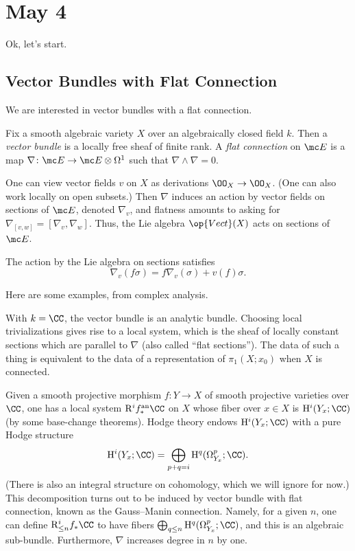 \documentclass[../notes.tex]{subfiles}
\begin{document}
\section{May 4}
Ok, let's start.

\subsection{Vector Bundles with Flat Connection}
We are interested in vector bundles with a flat connection.
\begin{definition}
	Fix a smooth algebraic variety $X$ over an algebraically closed field $k$. Then a \textit{vector bundle} is a locally free sheaf of finite rank. A \textit{flat connection} on $\mc E$ is a map $\nabla\colon\mc E\to\mc E\otimes\Omega^1$ such that $\nabla\land\nabla=0$.
\end{definition}
\begin{remark}
	One can view vector fields $v$ on $X$ as derivations $\OO_X\to\OO_X$. (One can also work locally on open subsets.) Then $\nabla$ induces an action by vector fields on sections of $\mc E$, denoted $\nabla_v$, and flatness amounts to asking for $\nabla_{[v,w]}=[\nabla_v,\nabla_w]$. Thus, the Lie algebra $\op{Vect}(X)$ acts on sections of $\mc E$.
\end{remark}
\begin{remark}
	The action by the Lie algebra on sections satisfies
	\[\nabla_v(f\sigma)=f\nabla_v(\sigma)+v(f)\sigma.\]
\end{remark}
Here are some examples, from complex analysis.
\begin{example}
	With $k=\CC$, the vector bundle is an analytic bundle. Choosing local trivializations gives rise to a local system, which is the sheaf of locally constant sections which are parallel to $\nabla$ (also called ``flat sections''). The data of such a thing is equivalent to the data of a representation of $\pi_1(X;x_0)$ when $X$ is connected.
\end{example}
\begin{example}
	Given a smooth projective morphism $f\colon Y\to X$ of smooth projective varieties over $\CC$, one has a local system $\mathrm R^if_*^{\mathrm{an}}\CC$ on $X$ whose fiber over $x\in X$ is $\mathrm H^i(Y_x;\CC)$ (by some base-change theorems). Hodge theory endows $\mathrm H^i(Y_x;\CC)$ with a pure Hodge structure
	\[\mathrm H^i(Y_x;\CC)=\bigoplus_{p+q=i}\mathrm H^q(\Omega^p_{Y_x};\CC).\]
	(There is also an integral structure on cohomology, which we will ignore for now.) This decomposition turns out to be induced by vector bundle with flat connection, known as the Gauss--Manin connection. Namely, for a given $n$, one can define $\mathrm R^i_{\le n}f_*\CC$ to have fibers $\bigoplus_{q\le n}\mathrm H^q(\Omega^p_{Y_x};\CC)$, and this is an algebraic sub-bundle. Furthermore, $\nabla$ increases degree in $n$ by one.
\end{example}
\end{document}
